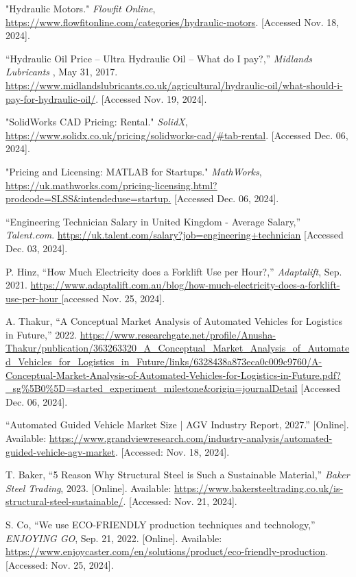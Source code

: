 \documentclass[12pt,titlepage]{article}
\begin{document}
\begin{thebibliography}{99}
 "Hydraulic Motors." \textit{Flowfit Online}, \url{https://www.flowfitonline.com/categories/hydraulic-motors}. [Accessed Nov. 18, 2024].

 “Hydraulic Oil Price – Ultra Hydraulic Oil – What do I pay?,” \textit{Midlands Lubricants} , May 31, 2017. \url{https://www.midlandslubricants.co.uk/agricultural/hydraulic-oil/what-should-i-pay-for-hydraulic-oil/}. [Accessed Nov. 19, 2024].

 "SolidWorks CAD Pricing: Rental." \textit{SolidX}, \url{https://www.solidx.co.uk/pricing/solidworks-cad/#tab-rental}. [Accessed Dec. 06, 2024].

 "Pricing and Licensing: MATLAB for Startups." \textit{MathWorks}, \url{https://uk.mathworks.com/pricing-licensing.html?prodcode=SLSS&intendeduse=startup.} [Accessed Dec. 06, 2024].

 “Engineering Technician Salary in United Kingdom - Average Salary,” \textit{Talent.com}. \url{https://uk.talent.com/salary?job=engineering+technician} [Accessed Dec. 03, 2024].

P. Hinz, “How Much Electricity does a Forklift Use per Hour?,” \textit{Adaptalift}, Sep. 2021. \url{https://www.adaptalift.com.au/blog/how-much-electricity-does-a-forklift-use-per-hour }[accessed Nov. 25, 2024].

 A. Thakur, “A Conceptual Market Analysis of Automated Vehicles for Logistics in Future,” 2022. \url{https://www.researchgate.net/profile/Anusha-Thakur/publication/363263320_A_Conceptual_Market_Analysis_of_Automated_Vehicles_for_Logistics_in_Future/links/6328438a873eca0c009c9760/A-Conceptual-Market-Analysis-of-Automated-Vehicles-for-Logistics-in-Future.pdf?_sg%5B0%5D=started_experiment_milestone&origin=journalDetail} [Accessed Dec. 06, 2024].

 “Automated Guided Vehicle Market Size | AGV Industry Report, 2027.” [Online]. Available: \url{https://www.grandviewresearch.com/industry-analysis/automated-guided-vehicle-agv-market}. [Accessed: Nov. 18, 2024].

 T. Baker, ``5 Reason Why Structural Steel is Such a Sustainable Material,'' \textit{Baker Steel Trading}, 2023. [Online]. Available: \url{https://www.bakersteeltrading.co.uk/is-structural-steel-sustainable/}. [Accessed: Nov. 21, 2024].

 S. Co, ``We use ECO-FRIENDLY production techniques and technology,'' \textit{ENJOYING GO}, Sep. 21, 2022. [Online]. Available: \url{https://www.enjoycaster.com/en/solutions/product/eco-friendly-production}. [Accessed: Nov. 25, 2024].


\end{thebibliography}
\end{document}
